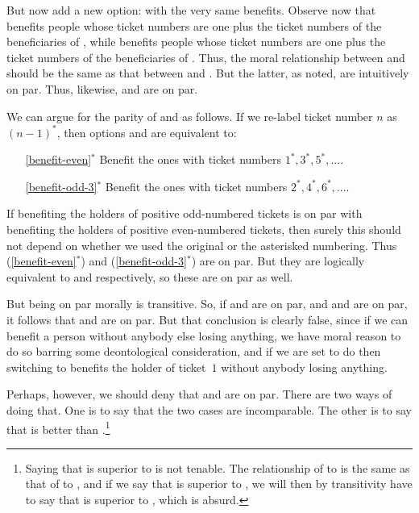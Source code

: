 But now add a new option:
with the very same benefits. 
Observe now that  benefits people whose ticket numbers are one plus the ticket 
numbers of the beneficiaries of , while  benefits people whose 
ticket numbers are one plus the ticket numbers of the beneficiaries of . Thus,
the moral relationship between  and  should be the same as that
between  and . 
But the latter, as noted, are intuitively on par. 
Thus, likewise,  and  are on par. 

We can argue for the parity of  and  as follows. If we re-label 
ticket number $n$ as $(n-1)^*$, then options  and  are equivalent to:
\begin{itemize}
	\item[\ref{benefit-even}$^*$]{Benefit the ones with ticket numbers $1^*,3^*,5^*,...$.}
	\item[\ref{benefit-odd-3}$^*$]{Benefit the ones with ticket numbers $2^*,4^*,6^*,...$.}
\end{itemize}
If benefiting the holders of positive odd-numbered tickets is on par with benefiting the holders of 
positive even-numbered tickets, then surely this should not depend on whether we used the original or 
the asterisked numbering. Thus (\ref{benefit-even}$^*$) and (\ref{benefit-odd-3}$^*$) are on par.
But they are logically equivalent to  and  respectively, so these
are on par as well.

But being on par morally is transitive. So, if  and  are on par,
and  and  are on par, it follows that 
and  are on par. But that conclusion is clearly false, since if we can benefit a 
person without anybody else losing anything, we have moral reason to do so barring some deontological consideration,
and if we are set to do  then switching to  benefits the holder of 
ticket~$1$ without anybody losing anything.

Perhaps, however, we should deny that  and  are on par. There are two
ways of doing that. One is to say that the two cases are incomparable. The other is to say that 
is better than .\footnote{Saying that  is superior to 
 is not tenable. The relationship of  to  is the 
same as that of  to , and if we say that  is superior
to , we will then by transitivity have to say that  is superior to 
, which is absurd.}

